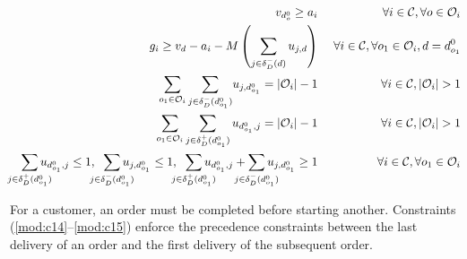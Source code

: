 \documentclass{article}
\begin{document}
\begin{alignat}{3}
    \label{mod:c9}   v_{d^0_{o}} \geq a_i & & \forall  i \in \mathcal{C}, \forall o \in \mathcal{O}_i\\
    \label{mod:c10}  g_{i} \geq v_{d} - a_i - M\left(  \sum_{ j \in \delta^{-}_{D}(d)  }{u_{j,d}}\right) & & \forall  i \in \mathcal{C}, \forall o_1 \in \mathcal{O}_i, d=d^0_{o_1} \\
    \label{mod:c11}   \sum_{ \substack{o_1 \in \mathcal{O}_i }}{ \sum_{ j \in \delta^{-}_{D}(d^0_{o_1})}}{u_{j,d^0_{o_1} } } = |\mathcal{O}_i|-1 & \text{ }& \forall  i \in \mathcal{C},|\mathcal{O}_i| > 1 \\
    \label{mod:c12}   \sum_{ \substack{o_1 \in \mathcal{O}_i }}\sum_{ j \in \delta^{+}_{D}(d^0_{o_1})}{u_{d^0_{o_1},j } } = |\mathcal{O}_i|-1 & \text{ }& \forall  i \in \mathcal{C}, |\mathcal{O}_i| > 1 \\
    \label{mod:c13}  \hspace{3mm} \smashoperator{ \sum_{ j \in \delta^{+}_{D}(d^0_{o_1})}}{u_{d^0_{o_1},j } } \leq 1, \hspace{2mm} \smashoperator{ \sum_{ j \in \delta^{-}_{D}(d^0_{o_1})}}{u_{j,d^0_{o_1} } } \leq 1, \hspace{2mm} \smashoperator{ \sum_{ j \in \delta^{+}_{D}(d^0_{o_1})}}{u_{d^0_{o_1},j } } +\smashoperator{ \sum_{ j \in \delta^{-}_{D}(d^0_{o_1})}}{u_{j,d^0_{o_1} } } \geq1         & \text{ }& \forall  i \in \mathcal{C}, \forall o_1 \in \mathcal{O}_i
\end{alignat}

For a customer, an order must be completed before starting another. Constraints (\ref{mod:c14}--\ref{mod:c15}) enforce the precedence constraints between the last delivery of an order and the first delivery of the subsequent order. 
\end{document}
